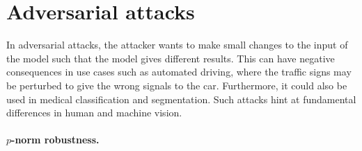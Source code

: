 \section{Adversarial attacks}

In adversarial attacks, the attacker wants to make small changes to the input of the model such
that the model gives different results. This can have negative consequences in use cases such as
automated driving, where the traffic signs may be perturbed to give the wrong signals to the car.
Furthermore, it could also be used in medical classification and segmentation. Such attacks hint at
fundamental differences in human and machine vision.

\paragraph{$p$-norm robustness.}

